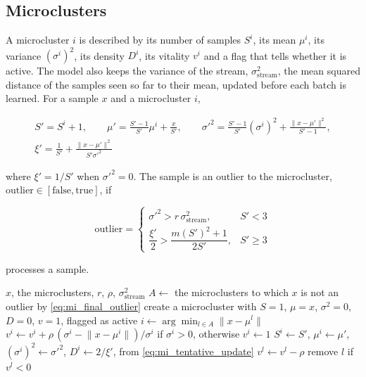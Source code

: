 \subsection{Microclusters}

A microcluster $i$ is described by its number of samples $S^i$, its mean $\mu^i$, its variance $(\sigma^i)^2$, its density $D^i$, its vitality $v^i$ and a flag that tells whether it is active. The model also keeps the variance of the stream, $\sigma^2_{\text{stream}}$, the mean squared distance of the samples seen so far to their mean, updated before each batch is learned. For a sample $x$ and a microcluster $i$,

\begin{equation}
\begin{gathered}
    S' = S^i + 1, \qquad \mu' = \frac{S' - 1}{S'} \mu^i + \frac{x}{S'}, \qquad \sigma'^2 = \frac{S' - 1}{S'} (\sigma^i)^2 + \frac{\lVert x - \mu' \rVert^2}{S' - 1}, \\
    \xi' = \frac{1}{S'} + \frac{\lVert x - \mu' \rVert^2}{S' \sigma'^2}
\end{gathered}
\label{eq:mi_tentative_update}
\end{equation}

where $\xi' = 1/S'$ when $\sigma'^2 = 0$. The sample is an outlier to the microcluster, $\text{outlier} \in [\text{false}, \text{true}]$, if

\begin{equation}
    \text{outlier} =
    \begin{cases}
        \sigma'^2 > r\,\sigma^2_{\text{stream}}, & S' < 3 \\[4pt]
        \dfrac{\xi'}{2} > \dfrac{m(S')^2 + 1}{2 S'}, & S' \ge 3
    \end{cases}
    \label{eq:mi_final_outlier}
\end{equation}

 processes a sample.

\begin{algorithm}[htbp]
\caption{Microcluster update of \MicroTEDAClusPlus for a sample $x$}
\label{alg:mi_final_microclusters}
\begin{algorithmic}[1]
\Require $x$, the microclusters, $r$, $\rho$, $\sigma^2_{\text{stream}}$
\State $A \gets$ the microclusters to which $x$ is not an outlier by \cref{eq:mi_final_outlier}
    \State create a microcluster with $S = 1$, $\mu = x$, $\sigma^2 = 0$, $D = 0$, $v = 1$, flagged as active
\Else
    \State $i \gets \arg\min_{l \in A} \lVert x - \mu^l \rVert$
    \State $v^i \gets v^i + \rho\,(\sigma^i - \lVert x - \mu^i \rVert)/\sigma^i$ if $\sigma^i > 0$, otherwise $v^i \gets 1$
    \State $S^i \gets S'$, $\mu^i \gets \mu'$, $(\sigma^i)^2 \gets \sigma'^2$, $D^i \gets 2/\xi'$, from \cref{eq:mi_tentative_update}
\EndIf
{}
    \State $v^l \gets v^l - \rho$
    \State remove $l$ if $v^l < 0$
\EndFor
\end{algorithmic}
\end{algorithm}

